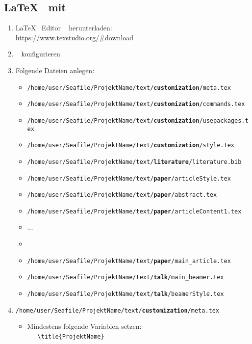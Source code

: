 \subsection{\LaTeX~ mit \texstudio}
\begin{enumerate}
	\item \LaTeX~ Editor \texstudio~ herunterladen: \\\url{https://www.texstudio.org/#download}
	\item \texstudio~ konfigurieren
	\item Folgende Dateien anlegen:
	      \begin{itemize}
		      \item \texttt{/home/user/Seafile/ProjektName/text/\textbf{customization}/meta.tex}
		      \item \texttt{/home/user/Seafile/ProjektName/text/\textbf{customization}/commands.tex}
		      \item \texttt{/home/user/Seafile/ProjektName/text/\textbf{customization}/usepackages.tex}
		      \item \texttt{/home/user/Seafile/ProjektName/text/\textbf{customization}/style.tex}
		      \item \texttt{/home/user/Seafile/ProjektName/text/\textbf{literature}/literature.bib}
		      \item \texttt{/home/user/Seafile/ProjektName/text/\textbf{paper}/articleStyle.tex}
		      \item \texttt{/home/user/Seafile/ProjektName/text/\textbf{paper}/abstract.tex}
		      \item \texttt{/home/user/Seafile/ProjektName/text/\textbf{paper}/articleContent1.tex}
		      \item ...
		      \item \item \texttt{/home/user/Seafile/ProjektName/text/\textbf{paper}/main\_article.tex}
		      \item \texttt{/home/user/Seafile/ProjektName/text/\textbf{talk}/main\_beamer.tex}
		      \item \texttt{/home/user/Seafile/ProjektName/text/\textbf{talk}/beamerStyle.tex}
	      \end{itemize}
	\item \texttt{/home/user/Seafile/ProjektName/text/\textbf{customization}/meta.tex}
	      \begin{itemize}
		      \item Mindestens folgende Variablen setzen: \\
		            ~~~\texttt{\textbackslash title\{ProjektName\}}\\

\end{itemize}
\end{enumerate}

